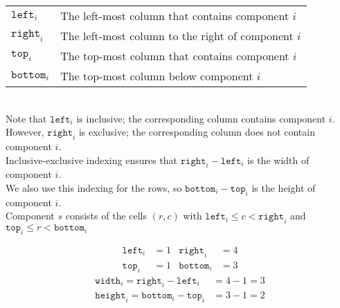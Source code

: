 \documentclass{scrartcl}
\begin{document}
	\begin{tabular}{ll}
		$\mathtt{left}_i$ & The left-most column that contains component $i$\\
		$\mathtt{right}_i$ & The left-most column to the right of component $i$\\
		$\mathtt{top}_i$ & The top-most column that contains component $i$\\
		$\mathtt{bottom}_i$ & The top-most column below component $i$\\
	\end{tabular}\\

	Note that $\mathtt{left}_i$ is inclusive; the corresponding column contains component $i$.\\
	However, $\mathtt{right}_i$ is exclusive; the corresponding column does not contain component $i$.\\
	Inclusive-exclusive indexing ensures that $\mathtt{right}_i-\mathtt{left}_i$ is the width of component $i$.\\
	We also use this indexing for the rows, so $\mathtt{bottom}_i-\mathtt{top}_i$ is the height of component $i$.\\
	Component $s$ consists of the cells $(r,c)$ with $\mathtt{left}_i \leq c < \mathtt{right}_i$ and $\mathtt{top}_i \leq r < \mathtt{bottom}_i$

	\begin{figure}[H]
		\centering
		\begin{subfigure}[b]{0.30\textwidth}
			\centering
			
		\end{subfigure}
		\begin{subfigure}[b]{0.5\textwidth}
			\centering
			\begin{align*}
				\mathtt{left}_i&=1 & \mathtt{right}_i &= 4\\
				\mathtt{top}_i&=1 & \mathtt{bottom}_i &= 3
			\end{align*}
			\begin{align*}
				\mathtt{width}_i=\mathtt{right}_i-\mathtt{left}_i&=4-1=3\\
				\mathtt{height}_i=\mathtt{bottom}_i-\mathtt{top}_i&=3-1=2
			\end{align*}
		\end{subfigure}
	\end{figure}
\end{document}
